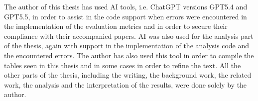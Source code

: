 \documentclass[12pt,leqno,a4paper]{article}
\begin{document}
The author of this thesis has used AI tools, i.e. ChatGPT  versions GPT5.4 and GPT5.5, in order to assist in the code support when errors were encountered in the implementation of the
evaluation metrics and in order to secure their compliance with their accompanied papers. AI was also used for the analysis part of the thesis, again with support in the implementation of the analysis code and the encountered errors. 
The author has also used this tool in order to compile the tables seen in this thesis and in some cases in order to refine the text. All the other parts of the thesis, including the writing, the background work, the related work, the analysis and the interpretation of the results, were done solely by the author.
\end{document}
